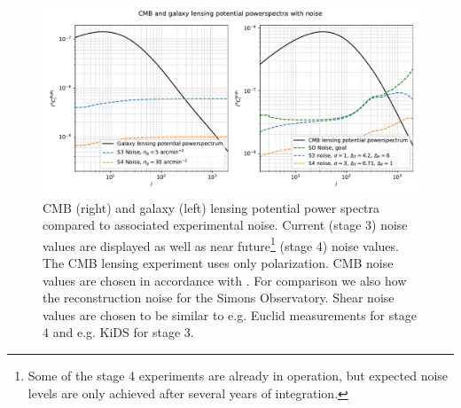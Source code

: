 \documentclass[11pt]{article} %
\begin{document}
\begin{figure}[t]
    \centering
    \includegraphics[width=\textwidth]{../code/plots/spectraplusnoise.pdf}
    \caption{CMB (right) and galaxy (left) lensing potential power spectra compared to associated experimental noise. Current (stage 3) noise values are displayed as well as near future\footnote{Some of the stage 4 experiments are already in operation, but expected noise levels are only achieved after several years of integration.} (stage 4) noise values. The CMB lensing experiment uses only polarization. CMB noise values are chosen in accordance with \cite{Namikawa_2016}. For comparison we also how the reconstruction noise for the Simons Observatory. Shear noise values are chosen to be similar to e.g. Euclid measurements for stage 4 and e.g. KiDS for stage 3.}
    \label{fig:lpsplusnoise}
\end{figure}






\end{document}
